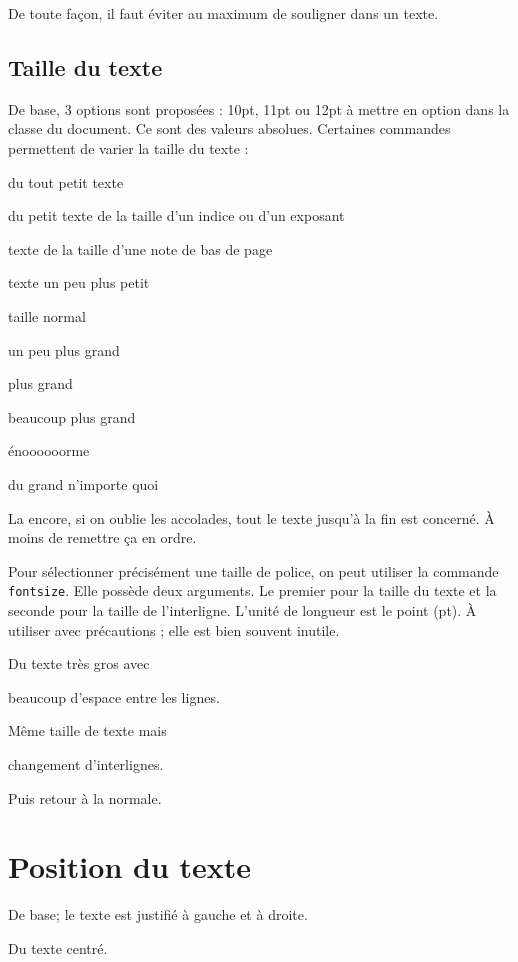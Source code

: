 \documentclass[10pt,frenchb]{book} %
\begin{document}
De toute façon, il faut éviter au maximum de souligner dans un texte.

\subsection{Taille du texte}
De base, 3 options sont proposées : 10pt, 11pt ou 12pt à mettre en option dans la classe du document. Ce sont des valeurs absolues. Certaines commandes permettent de varier la taille du texte :\par
{\tiny du tout petit texte}\par
{\scriptsize du petit texte de la taille d'un indice ou d'un exposant}\par
{\footnotesize texte de la taille d'une note de bas de page}\par
{\small texte un peu plus petit}\par
{\normalsize taille normal}\par
{\large un peu plus grand}\par
{\Large plus grand}\par
{\LARGE beaucoup plus grand}\par
{\huge énoooooorme}\par
{\Huge du grand n'importe quoi}

La encore, si on oublie \tiny les accolades, tout le texte jusqu'à la fin est concerné. \normalsize À moins de remettre ça en ordre.

Pour sélectionner précisément une taille de police, on peut utiliser la commande \texttt{fontsize}. Elle possède deux arguments. Le premier pour la taille du texte et la seconde pour la taille de l'interligne. L'unité de longueur est le point (pt). À utiliser avec précautions ; elle est bien souvent inutile.

{\fontsize{50}{60}\selectfont Du texte très gros avec \par beaucoup d'espace entre les lignes.}\bigskip

{\fontsize{50}{30}\selectfont Même taille de texte mais \par changement d'interlignes.} Puis retour à la normale.

\section{Position du texte}

De base; le texte est justifié à gauche et à droite.

\begin{center}
    Du texte centré.
\end{center}
\end{document}
